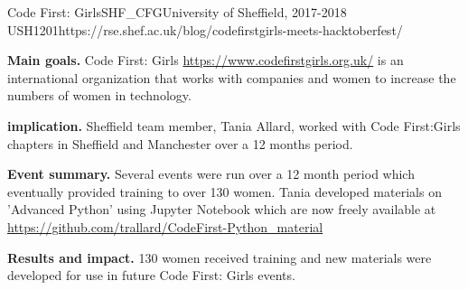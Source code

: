 \begin{event}{Code First: Girls}{SHF_CFG}{University of Sheffield, 2017-2018 }{USH}{120}{1}{https://rse.shef.ac.uk/blog/codefirstgirls-meets-hacktoberfest/}

\textbf{Main goals.} Code First: Girls \url{https://www.codefirstgirls.org.uk/} is an international organization that works with companies and women to increase the numbers of women in technology.

\textbf{\ODK implication.} \ODK Sheffield team member, Tania Allard, worked with Code First:Girls chapters in Sheffield and Manchester over a 12 months period.

\textbf{Event summary.} Several events were run over a 12 month period which eventually provided training to over 130 women.  Tania developed materials on 'Advanced Python' using Jupyter Notebook which are now freely available at \url{https://github.com/trallard/CodeFirst-Python_material}

\textbf{Results and impact.} 130 women received training and new materials were developed for use in future Code First: Girls events.

\end{event}
